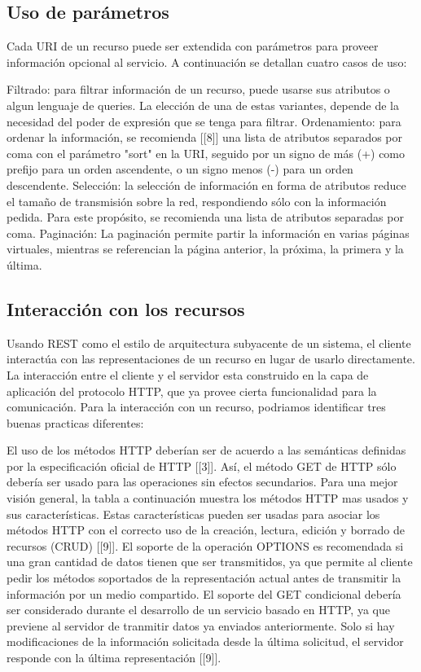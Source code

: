 \subsection[Uso de parámetros]{Uso de parámetros}

Cada URI de un recurso puede ser extendida con parámetros para proveer información opcional al servicio. A continuación se detallan cuatro casos de uso:
\begin{outline}
    \1 Filtrado: para filtrar información de un recurso, puede usarse sus atributos o algun lenguaje de queries. La elección de una de estas variantes, depende de la necesidad del poder de expresión que se tenga para filtrar. 
    \1 Ordenamiento: para ordenar la información, se recomienda [[8]] una lista de atributos separados por coma con el parámetro "sort" en la URI, seguido por un signo de más (+) como prefijo para un orden ascendente, o un signo menos (-) para un orden descendente.
    \1 Selección: la selección de información en forma de atributos reduce el tamaño de transmisión sobre la red, respondiendo sólo con la información pedida. Para este propósito, se recomienda una lista de atributos separadas por coma.
    \1 Paginación: La paginación permite partir la información en varias páginas virtuales, mientras se referencian la página anterior, la próxima, la primera y la última. 
\end{outline}
\subsection[Interacción con los recursos]{Interacción con los recursos}

Usando REST como el estilo de arquitectura subyacente de un sistema, el cliente interactúa con las representaciones de un recurso en lugar de usarlo directamente. La interacción entre el cliente y el servidor esta construido en la capa de aplicación del protocolo HTTP, que ya provee cierta funcionalidad para la comunicación. Para la interacción con un recurso, podriamos identificar tres buenas practicas diferentes:
\begin{outline}
    \1 El uso de los métodos HTTP deberían ser de acuerdo a las semánticas definidas por la especificación oficial de HTTP [[3]]. Así, el método GET de HTTP sólo debería ser usado para las operaciones sin efectos secundarios. Para una mejor visión general, la tabla a continuación muestra los métodos HTTP mas usados y sus características. Estas características pueden ser usadas para asociar los métodos HTTP con el correcto uso de la creación, lectura, edición y borrado de recursos (CRUD) [[9]].
    \1 El soporte de la operación OPTIONS es recomendada si una gran cantidad de datos tienen que ser transmitidos, ya que permite al cliente pedir los métodos soportados de la representación actual antes de transmitir la información por un medio compartido. 
    \1 El soporte del GET condicional debería ser considerado durante el desarrollo de un servicio basado en HTTP, ya que previene al servidor de tranmitir datos ya enviados anteriormente. Solo si hay modificaciones de la información solicitada desde la última solicitud, el servidor responde con la última representación [[9]].
\end{outline}

